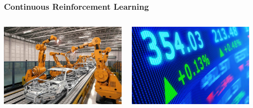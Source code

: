 \documentclass[aspectratio=169, table]{beamer}
\begin{document}
\begin{frame}
\frametitle{Continuous Reinforcement Learning}
\begin{columns}
		\begin{column}{.5\textwidth}
			\includegraphics[width=\textwidth]{robots.jpeg}
		\end{column}
	\hfill
			\begin{column}{.5\textwidth}
			\includegraphics[width=\textwidth]{finance.jpg}
		\end{column}
\end{columns}
\end{frame}
\end{document}
